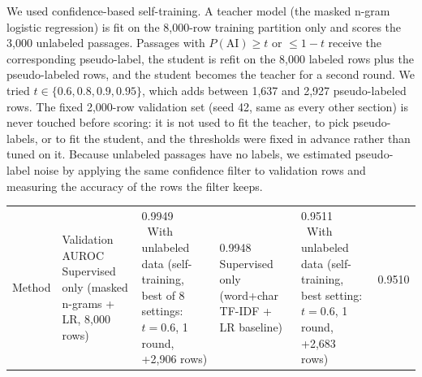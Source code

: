 
We used confidence-based self-training. A teacher model (the masked n-gram logistic regression) is fit on the 8{,}000-row training partition only and scores the 3{,}000 unlabeled passages. Passages with $P(\text{AI}) \geq t$ or $\leq 1-t$ receive the corresponding pseudo-label, the student is refit on the 8{,}000 labeled rows plus the pseudo-labeled rows, and the student becomes the teacher for a second round. We tried $t \in \{0.6, 0.8, 0.9, 0.95\}$, which adds between 1{,}637 and 2{,}927 pseudo-labeled rows. The fixed 2{,}000-row validation set (seed 42, same as every other section) is never touched before scoring: it is not used to fit the teacher, to pick pseudo-labels, or to fit the student, and the thresholds were fixed in advance rather than tuned on it. Because unlabeled passages have no labels, we estimated pseudo-label noise by applying the same confidence filter to validation rows and measuring the accuracy of the rows the filter keeps.

\begin{tabularx}{\linewidth}{@{}Yp{1.5in}@{}}\toprule Method & Validation AUROC \ \midrule
Supervised only (masked n-grams + LR, 8{,}000 rows) & 0.9949 \
With unlabeled data (self-training, best of 8 settings: $t=0.6$, 1 round, +2{,}906 rows) & 0.9948 \
\midrule
Supervised only (word+char TF-IDF + LR baseline) & 0.9511 \
With unlabeled data (self-training, best setting: $t=0.6$, 1 round, +2{,}683 rows) & 0.9510 \
\bottomrule\end{tabularx}

